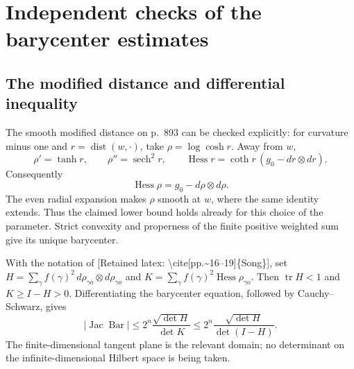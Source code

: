 \documentclass[10pt]{article}
\begin{document}
\section*{Independent checks of the barycenter estimates}
\subsection*{The modified distance and differential inequality}
The smooth modified distance on p. 893 can be checked explicitly: for curvature minus one and \(r=\operatorname{dist}(w,\cdot)\), take \(\rho=\log\cosh r\). Away from \(w\), \[\rho'=\tanh r,\qquad \rho''=\operatorname{sech}^2r,\qquad
 \operatorname{Hess}r=\coth r\,(g_0-dr\otimes dr).\] Consequently \[\operatorname{Hess}\rho
   =g_0-d\rho\otimes d\rho .\] The even radial expansion makes \(\rho\) smooth at \(w\), where the same identity extends. Thus the claimed lower bound holds already for this choice of the parameter. Strict convexity and properness of the finite positive weighted sum give its unique barycenter.\par
With the notation of [Retained latex: \textbackslash{}cite[pp.\textasciitilde{}16--19]\{Song\}], set \(H=\sum_\gamma f(\gamma)^2\,d\rho_{\gamma o}\otimes
d\rho_{\gamma o}\) and \(K=\sum_\gamma f(\gamma)^2\operatorname{Hess}\rho_{\gamma o}\). Then \(\operatorname{tr}H<1\) and \(K\geq I-H>0\). Differentiating the barycenter equation, followed by Cauchy–Schwarz, gives \[\left|\operatorname{Jac}\operatorname{Bar}\right|
 \leq 2^n\frac{\sqrt{\det H}}{\det K}
 \leq 2^n\frac{\sqrt{\det H}}{\det(I-H)}.\] The finite-dimensional tangent plane is the relevant domain; no determinant on the infinite-dimensional Hilbert space is being taken.\par
\end{document}
